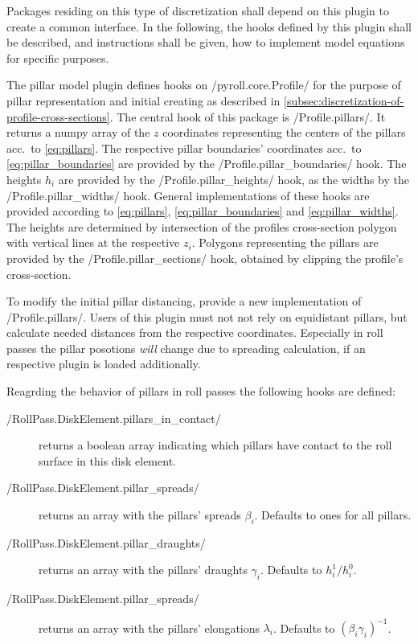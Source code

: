 \documentclass[11pt]{PyRollDocs}
\begin{document}
    Packages residing on this type of discretization shall depend on this plugin to create a common interface.
    In the following, the hooks defined by this plugin shall be described, and instructions shall be given, how to implement model equations for specific purposes.

    The pillar model plugin defines hooks on \py/pyroll.core.Profile/ for the purpose of pillar representation and initial creating as described in \autoref{subsec:discretization-of-profile-cross-sections}.
    The central hook of this package is \py/Profile.pillars/.
    It returns a numpy array of the $z$ coordinates representing the centers of the pillars acc.\ to \autoref{eq:pillars}.
    The respective pillar boundaries' coordinates acc.\ to \autoref{eq:pillar_boundaries}  are provided by the \py/Profile.pillar_boundaries/ hook.
    The heights $h_i$ are provided by the \py/Profile.pillar_heights/ hook, as the widths by the \py/Profile.pillar_widths/ hook.
    General implementations of these hooks are provided according to \autoref{eq:pillars}, \autoref{eq:pillar_boundaries} and \autoref{eq:pillar_widths}.
    The heights are determined by intersection of the profiles cross-section polygon with vertical lines at the respective $z_i$.
    Polygons representing the pillars are provided by the \py/Profile.pillar_sections/ hook, obtained by clipping the profile's cross-section.

    To modify the initial pillar distancing, provide a new implementation of \py/Profile.pillars/.
    Users of this plugin must not not rely on equidistant pillars, but calculate needed distances from the respective coordinates.
    Especially in roll passes the pillar posotions \emph{will} change due to spreading calculation, if an respective plugin is loaded additionally.

    Reagrding the behavior of pillars in roll passes the following hooks are defined:
    \begin{description}
        \item[\py/RollPass.DiskElement.pillars_in_contact/] returns a boolean array indicating which pillars have contact to the roll surface in this disk element.
        \item[\py/RollPass.DiskElement.pillar_spreads/] returns an array with the pillars' spreads $\beta_i$. Defaults to ones for all pillars.
        \item[\py/RollPass.DiskElement.pillar_draughts/] returns an array with the pillars' draughts $\gamma_i$. Defaults to $h_i^1 / h_i^0$.
        \item[\py/RollPass.DiskElement.pillar_spreads/] returns an array with the pillars' elongations $\lambda_i$. Defaults to $(\beta_i\gamma_i)^{-1}$.
    \end{description}
\end{document}
